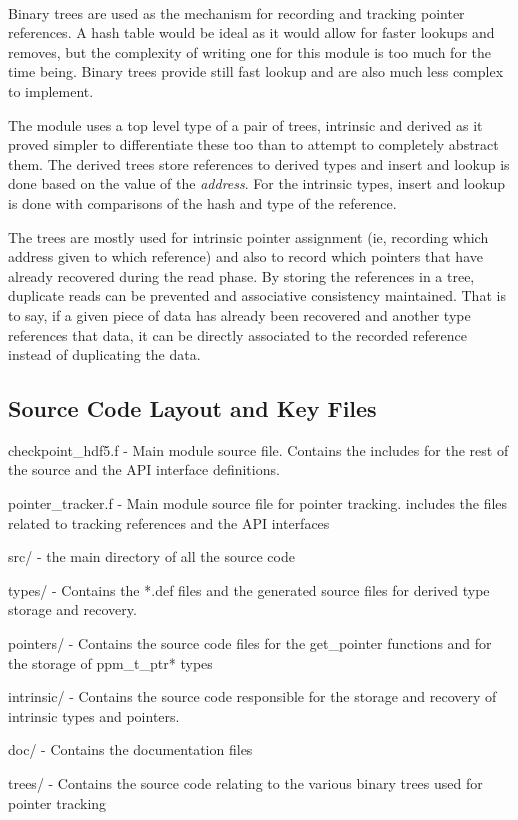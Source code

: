 \documentclass{article}
\begin{document}
\paragraph{}
Binary trees are used as the mechanism for recording and tracking pointer references. A hash table would be ideal as it would allow for faster lookups and removes, but the complexity of writing one for this module is too much for the time being. Binary trees provide still fast lookup and are also much less complex to implement.

The module uses a top level type of a pair of trees, intrinsic and derived as it proved simpler to differentiate these too than to attempt to completely abstract them. The derived trees store references to derived types and insert and lookup is done based on the value of the \emph{address}. For the intrinsic types, insert and lookup is done with comparisons of the hash and type of the reference.

The trees are mostly used for intrinsic pointer assignment (ie, recording which address given to which reference) and also to record which pointers that have already recovered during the read phase. By storing the references in a tree, duplicate reads can be prevented and associative consistency maintained. That is to say, if a given piece of data has already been recovered and another type references that data, it can be directly associated to the recorded reference instead of duplicating the data.

\subsection{Source Code Layout and Key Files}
\begin{list}{}{}
\item checkpoint\_hdf5.f - Main module source file. Contains the includes for the rest of the source and the API interface definitions.
\item pointer\_tracker.f - Main module source file for pointer tracking. includes the files related to tracking references and the API interfaces
\item src/ - the main directory of all the source code
\item types/ - Contains the *.def files and the generated source files for derived type storage and recovery.
\item pointers/ - Contains the source code files for the get\_pointer functions and for the storage of ppm\_t\_ptr* types
\item intrinsic/ - Contains the source code responsible for the storage and recovery of intrinsic types and pointers.
\item doc/ - Contains the documentation files
\item trees/ - Contains the source code relating to the various binary trees used for pointer tracking
\end{list}
\end{document}
